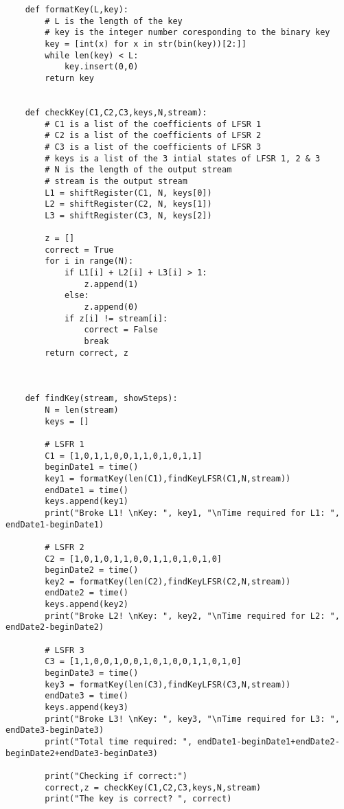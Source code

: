 \documentclass{article}
\begin{document}
\begin{verbatim}
    def formatKey(L,key):
        # L is the length of the key
        # key is the integer number coresponding to the binary key
        key = [int(x) for x in str(bin(key))[2:]]
        while len(key) < L:
            key.insert(0,0)
        return key
    
    
    def checkKey(C1,C2,C3,keys,N,stream):
        # C1 is a list of the coefficients of LFSR 1
        # C2 is a list of the coefficients of LFSR 2
        # C3 is a list of the coefficients of LFSR 3
        # keys is a list of the 3 intial states of LFSR 1, 2 & 3
        # N is the length of the output stream
        # stream is the output stream
        L1 = shiftRegister(C1, N, keys[0])
        L2 = shiftRegister(C2, N, keys[1])
        L3 = shiftRegister(C3, N, keys[2])
    
        z = []
        correct = True
        for i in range(N):
            if L1[i] + L2[i] + L3[i] > 1:
                z.append(1)
            else:
                z.append(0)
            if z[i] != stream[i]:
                correct = False
                break
        return correct, z
    
    
    
    def findKey(stream, showSteps):
        N = len(stream)
        keys = []
    
        # LSFR 1
        C1 = [1,0,1,1,0,0,1,1,0,1,0,1,1]
        beginDate1 = time()
        key1 = formatKey(len(C1),findKeyLFSR(C1,N,stream)) 
        endDate1 = time()
        keys.append(key1)
        print("Broke L1! \nKey: ", key1, "\nTime required for L1: ", endDate1-beginDate1)
    
        # LSFR 2
        C2 = [1,0,1,0,1,1,0,0,1,1,0,1,0,1,0]
        beginDate2 = time()
        key2 = formatKey(len(C2),findKeyLFSR(C2,N,stream)) 
        endDate2 = time()
        keys.append(key2)
        print("Broke L2! \nKey: ", key2, "\nTime required for L2: ", endDate2-beginDate2)
    
        # LSFR 3
        C3 = [1,1,0,0,1,0,0,1,0,1,0,0,1,1,0,1,0]
        beginDate3 = time()
        key3 = formatKey(len(C3),findKeyLFSR(C3,N,stream)) 
        endDate3 = time()
        keys.append(key3)
        print("Broke L3! \nKey: ", key3, "\nTime required for L3: ", endDate3-beginDate3)
        print("Total time required: ", endDate1-beginDate1+endDate2-beginDate2+endDate3-beginDate3)
    
        print("Checking if correct:")
        correct,z = checkKey(C1,C2,C3,keys,N,stream)
        print("The key is correct? ", correct)
    

\end{verbatim}
\end{document}
